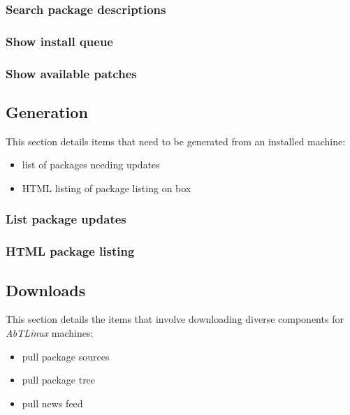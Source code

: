 \subsubsection{Search package descriptions}


\subsubsection{Show install queue}


\subsubsection{Show available patches}



\newpage
\subsection{Generation}
This section details items that need to be generated from an installed
machine:

\begin{itemize}
  \item list of packages needing updates
  \item HTML listing of package listing on box
\end{itemize}

%
%
\subsubsection{List package updates}


\subsubsection{HTML package listing}



\subsection{Downloads}
This section details the items that involve downloading diverse components
for \emph{AbTLinux} machines:

\begin{itemize}
  \item pull package sources
  \item pull package tree
  \item pull news feed 
  \end{itemize}

